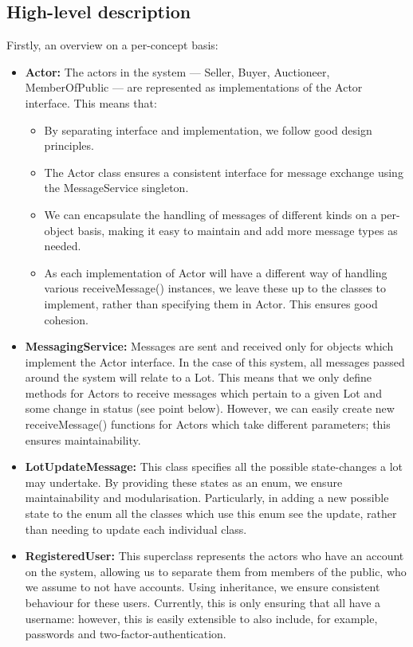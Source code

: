 \documentclass[titlepage, 12pt]{extarticle}
\begin{document}
\subsection{High-level description}
\noindent Firstly, an overview on a per-concept basis:
\begin{itemize}
\item {\bf Actor: } The actors in the system --- Seller, Buyer, Auctioneer, MemberOfPublic --- are represented as implementations of the Actor interface. This means that:
  \begin{itemize}
  \item By separating interface and implementation, we follow good design principles.
  \item The Actor class ensures a consistent interface for message exchange using the MessageService singleton.
  \item We can encapsulate the handling of messages of different kinds on a per-object basis, making it easy to maintain and add more message types as needed.
  \item As each implementation of Actor will have a different way of handling various receiveMessage() instances, we leave these up to the classes to implement, rather than specifying them in Actor. This ensures good cohesion. 
  \end{itemize}
\item {\bf MessagingService: } Messages are sent and received only for objects which implement the Actor interface. In the case of this system, all messages passed around the system will relate to a Lot. This means that we only define methods for Actors to receive messages which pertain to a given Lot and some change in status (see point below). However, we can easily create new receiveMessage() functions for Actors which take different parameters; this ensures maintainability.
\item {\bf LotUpdateMessage: } This class specifies all the possible state-changes a lot may undertake. By providing these states as an enum, we ensure maintainability and modularisation. Particularly, in adding a new possible state to the enum all the classes which use this enum see the update, rather than needing to update each individual class.
\item {\bf RegisteredUser: } This superclass represents the actors who have an account on the system, allowing us to separate them from members of the public, who we assume to not have accounts. Using inheritance, we ensure consistent behaviour for these users. Currently, this is only ensuring that all have a username: however, this is easily extensible to also include, for example, passwords and two-factor-authentication.

\end{itemize}
\end{document}
